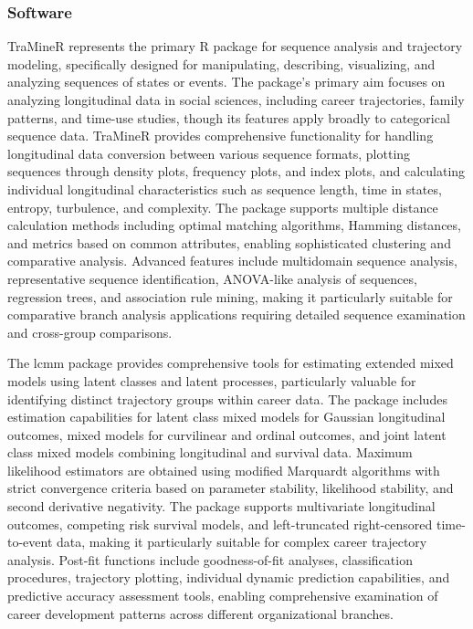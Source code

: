 \documentclass[main.tex]{subfiles}
\begin{document}
\subsubsection{Software}


TraMineR represents the primary R package for sequence analysis and trajectory modeling, specifically designed for manipulating, describing, visualizing, and analyzing sequences of states or events\parencite{TraMineR2024}. The package's primary aim focuses on analyzing longitudinal data in social sciences, including career trajectories, family patterns, and time-use studies, though its features apply broadly to categorical sequence data. TraMineR provides comprehensive functionality for handling longitudinal data conversion between various sequence formats, plotting sequences through density plots, frequency plots, and index plots, and calculating individual longitudinal characteristics such as sequence length, time in states, entropy, turbulence, and complexity. The package supports multiple distance calculation methods including optimal matching algorithms, Hamming distances, and metrics based on common attributes, enabling sophisticated clustering and comparative analysis. Advanced features include multidomain sequence analysis, representative sequence identification, ANOVA-like analysis of sequences, regression trees, and association rule mining, making it particularly suitable for comparative branch analysis applications requiring detailed sequence examination and cross-group comparisons.


The lcmm package provides comprehensive tools for estimating extended mixed models using latent classes and latent processes, particularly valuable for identifying distinct trajectory groups within career data\parencite{lcmm2025, ProustLima2017}. The package includes estimation capabilities for latent class mixed models for Gaussian longitudinal outcomes, mixed models for curvilinear and ordinal outcomes, and joint latent class mixed models combining longitudinal and survival data. Maximum likelihood estimators are obtained using modified Marquardt algorithms with strict convergence criteria based on parameter stability, likelihood stability, and second derivative negativity. The package supports multivariate longitudinal outcomes, competing risk survival models, and left-truncated right-censored time-to-event data, making it particularly suitable for complex career trajectory analysis. Post-fit functions include goodness-of-fit analyses, classification procedures, trajectory plotting, individual dynamic prediction capabilities, and predictive accuracy assessment tools, enabling comprehensive examination of career development patterns across different organizational branches.
\end{document}
